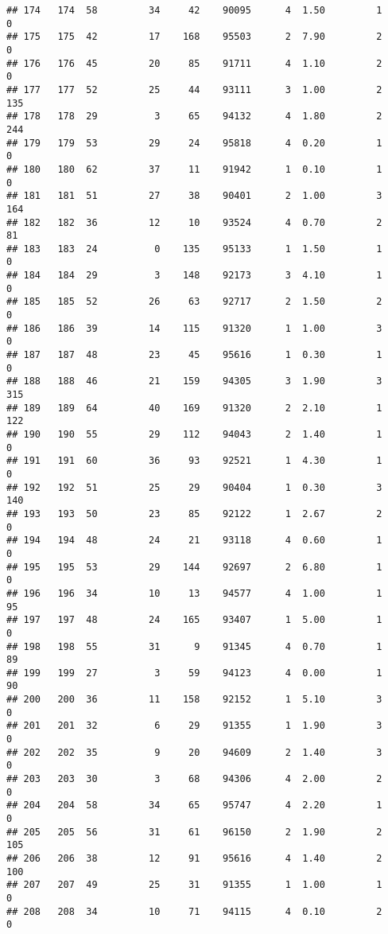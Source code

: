 \documentclass[
]{article}
\begin{document}
\begin{verbatim}
## 174   174  58         34     42    90095      4  1.50         1        0
## 175   175  42         17    168    95503      2  7.90         2        0
## 176   176  45         20     85    91711      4  1.10         2        0
## 177   177  52         25     44    93111      3  1.00         2      135
## 178   178  29          3     65    94132      4  1.80         2      244
## 179   179  53         29     24    95818      4  0.20         1        0
## 180   180  62         37     11    91942      1  0.10         1        0
## 181   181  51         27     38    90401      2  1.00         3      164
## 182   182  36         12     10    93524      4  0.70         2       81
## 183   183  24          0    135    95133      1  1.50         1        0
## 184   184  29          3    148    92173      3  4.10         1        0
## 185   185  52         26     63    92717      2  1.50         2        0
## 186   186  39         14    115    91320      1  1.00         3        0
## 187   187  48         23     45    95616      1  0.30         1        0
## 188   188  46         21    159    94305      3  1.90         3      315
## 189   189  64         40    169    91320      2  2.10         1      122
## 190   190  55         29    112    94043      2  1.40         1        0
## 191   191  60         36     93    92521      1  4.30         1        0
## 192   192  51         25     29    90404      1  0.30         3      140
## 193   193  50         23     85    92122      1  2.67         2        0
## 194   194  48         24     21    93118      4  0.60         1        0
## 195   195  53         29    144    92697      2  6.80         1        0
## 196   196  34         10     13    94577      4  1.00         1       95
## 197   197  48         24    165    93407      1  5.00         1        0
## 198   198  55         31      9    91345      4  0.70         1       89
## 199   199  27          3     59    94123      4  0.00         1       90
## 200   200  36         11    158    92152      1  5.10         3        0
## 201   201  32          6     29    91355      1  1.90         3        0
## 202   202  35          9     20    94609      2  1.40         3        0
## 203   203  30          3     68    94306      4  2.00         2        0
## 204   204  58         34     65    95747      4  2.20         1        0
## 205   205  56         31     61    96150      2  1.90         2      105
## 206   206  38         12     91    95616      4  1.40         2      100
## 207   207  49         25     31    91355      1  1.00         1        0
## 208   208  34         10     71    94115      4  0.10         2        0

\end{verbatim}
\end{document}
